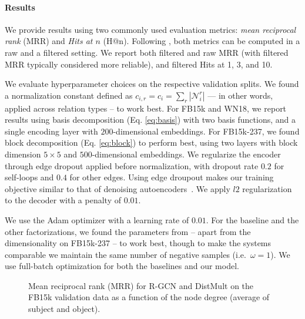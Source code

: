 \paragraph{Results}
We provide results using two commonly used evaluation metrics: \textit{mean reciprocal rank} (MRR) and \textit{Hits at $n$} (H@n).
Following \citet{bordes2013translating}, both metrics can be computed in a raw and a filtered setting. We report both filtered and raw MRR (with filtered MRR typically considered more reliable), and filtered Hits at 1, 3, and 10.

We evaluate hyperparameter choices on the respective validation splits. We found a normalization constant defined as $c_{i,r}=c_{i}=\sum_{r} |\mathcal{N}^r_i|$ --- in other words, applied across relation types -- to work best. For FB15k and WN18, we report results using basis decomposition (Eq. \ref{eq:basis}) with two basis functions, and a single encoding layer with $200$-dimensional embeddings. For FB15k-237, we found block decomposition (Eq. \ref{eq:block}) to perform best, using two layers with block dimension $5 \times 5$ and $500$-dimensional embeddings. We regularize the encoder through edge dropout applied before normalization, with dropout rate $0.2$ for self-loops and $0.4$ for other edges. Using edge droupout makes our training objective similar to that of denoising autoencoders~\cite{vincent2008}. We apply $l2$ regularization to the decoder with a penalty of $0.01$.

We use the Adam optimizer \cite{kingma2014adam} with a learning rate of $0.01$. For the baseline and the other factorizations, we found the parameters from \citet{complex-complex_embeddings_for_simple_link_prediction} -- apart from the dimensionality on FB15k-237 -- to work best, though to make the systems comparable we maintain the same number of negative samples (i.e.~$\omega=1$). We use full-batch optimization for both the baselines and our model.

\begin{figure}
\centering
{}\vspace{-0.5em}
\caption{Mean reciprocal rank (MRR) for R-GCN  and DistMult on the FB15k validation data as a function of the node degree (average of subject and object).\label{figure:degree}}
\end{figure}

